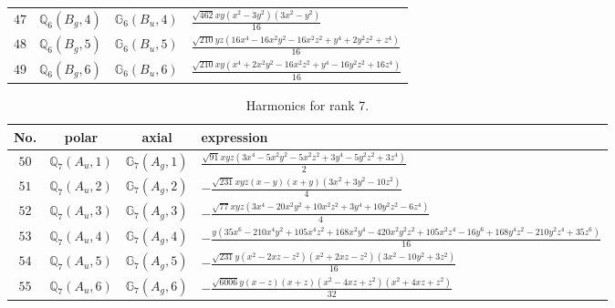 \documentclass[fleqn,8pt,landscape]{jsarticle}
\begin{document}
\begin{table}[ht!]
\begin{center}
\begin{tabular}{cccl}
$ 47 $ & $ \mathbb{Q}_{6}(B_{g},4) $ & $ \mathbb{G}_{6}(B_{u},4) $ & $ \frac{\sqrt{462} x y \left(x^{2} - 3 y^{2}\right) \left(3 x^{2} - y^{2}\right)}{16} $ \\
$ 48 $ & $ \mathbb{Q}_{6}(B_{g},5) $ & $ \mathbb{G}_{6}(B_{u},5) $ & $ \frac{\sqrt{210} y z \left(16 x^{4} - 16 x^{2} y^{2} - 16 x^{2} z^{2} + y^{4} + 2 y^{2} z^{2} + z^{4}\right)}{16} $ \\
$ 49 $ & $ \mathbb{Q}_{6}(B_{g},6) $ & $ \mathbb{G}_{6}(B_{u},6) $ & $ \frac{\sqrt{210} x y \left(x^{4} + 2 x^{2} y^{2} - 16 x^{2} z^{2} + y^{4} - 16 y^{2} z^{2} + 16 z^{4}\right)}{16} $ \\
 \hline \hline
\end{tabular}
\end{center}
\end{table}
\begin{table}[ht!]
\begin{center}
\caption{Harmonics for rank 7.}
\renewcommand{\arraystretch}{1.3}
\begin{tabular}{cccl} \hline \hline
No. & polar & axial & expression \\ \hline
$ 50 $ & $ \mathbb{Q}_{7}(A_{u},1) $ & $ \mathbb{G}_{7}(A_{g},1) $ & $ \frac{\sqrt{91} x y z \left(3 x^{4} - 5 x^{2} y^{2} - 5 x^{2} z^{2} + 3 y^{4} - 5 y^{2} z^{2} + 3 z^{4}\right)}{2} $ \\
$ 51 $ & $ \mathbb{Q}_{7}(A_{u},2) $ & $ \mathbb{G}_{7}(A_{g},2) $ & $ - \frac{\sqrt{231} x y z \left(x - y\right) \left(x + y\right) \left(3 x^{2} + 3 y^{2} - 10 z^{2}\right)}{4} $ \\
$ 52 $ & $ \mathbb{Q}_{7}(A_{u},3) $ & $ \mathbb{G}_{7}(A_{g},3) $ & $ - \frac{\sqrt{77} x y z \left(3 x^{4} - 20 x^{2} y^{2} + 10 x^{2} z^{2} + 3 y^{4} + 10 y^{2} z^{2} - 6 z^{4}\right)}{4} $ \\
$ 53 $ & $ \mathbb{Q}_{7}(A_{u},4) $ & $ \mathbb{G}_{7}(A_{g},4) $ & $ - \frac{y \left(35 x^{6} - 210 x^{4} y^{2} + 105 x^{4} z^{2} + 168 x^{2} y^{4} - 420 x^{2} y^{2} z^{2} + 105 x^{2} z^{4} - 16 y^{6} + 168 y^{4} z^{2} - 210 y^{2} z^{4} + 35 z^{6}\right)}{16} $ \\
$ 54 $ & $ \mathbb{Q}_{7}(A_{u},5) $ & $ \mathbb{G}_{7}(A_{g},5) $ & $ - \frac{\sqrt{231} y \left(x^{2} - 2 x z - z^{2}\right) \left(x^{2} + 2 x z - z^{2}\right) \left(3 x^{2} - 10 y^{2} + 3 z^{2}\right)}{16} $ \\
$ 55 $ & $ \mathbb{Q}_{7}(A_{u},6) $ & $ \mathbb{G}_{7}(A_{g},6) $ & $ - \frac{\sqrt{6006} y \left(x - z\right) \left(x + z\right) \left(x^{2} - 4 x z + z^{2}\right) \left(x^{2} + 4 x z + z^{2}\right)}{32} $ \\

\end{tabular}
\end{center}
\end{table}
\end{document}
